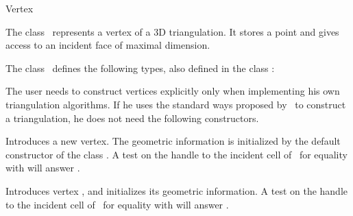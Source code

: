 

\begin{ccRefClass}{Vertex}  %


\ccDefinition
  
The class \ccRefName\ represents a vertex of a 3D triangulation. 
It stores a point and gives access to an incident face of 
maximal dimension.


\ccInheritsFrom
{}

\ccTypes
{}
The class \ccClassTemplateName\ defines the following types, also
defined in the class :

\ccGlue
{}
\ccGlue
{}

\ccCreation
{}  %

\begin{ccAdvanced}
\ccCreation
The user needs to construct vertices explicitly only when implementing his
own triangulation algorithms. If he uses the standard ways proposed by 
\cgal\ to construct a triangulation, he does not need the following
constructors. 

{Introduces a new vertex. The geometric information is initialized by
the default constructor of the class . A test on the handle
to the incident cell of \ccVar\ for equality with  will
answer .} 

{Introduces vertex \ccVar, and initializes its geometric information.
A test on the handle
to the incident cell of \ccVar\ for equality with  will
answer .}


\end{ccAdvanced}
\end{ccRefClass}
